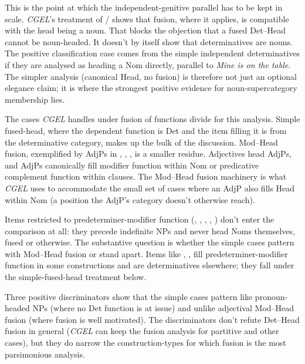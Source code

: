 \documentclass[12pt]{article}
\begin{document}
This is the point at which the independent-genitive parallel has to be kept in scale. \textit{CGEL}'s treatment of / shows that fusion, where it applies, is compatible with the head being a noun. That blocks the objection that a fused Det--Head cannot be noun-headed. It doesn't by itself show that determinatives are nouns. The positive classification case comes from the simple independent determinatives if they are analysed as heading a Nom directly, parallel to \textit{Mine is on the table}. The simpler analysis (canonical Head, no fusion) is therefore not just an optional elegance claim; it is where the strongest positive evidence for noun-supercategory membership lies.

The cases \textit{CGEL} handles under fusion of functions divide for this analysis. Simple fused-head, where the dependent function is Det and the item filling it is from the determinative category, makes up the bulk of the discussion. Mod--Head fusion, exemplified by AdjPs in , , , is a smaller residue. Adjectives head AdjPs, and AdjPs canonically fill modifier function within Nom or predicative complement function within clauses. The Mod--Head fusion machinery is what \textit{CGEL} uses to accommodate the small set of cases where an AdjP also fills Head within Nom (a position the AdjP's category doesn't otherwise reach).

Items restricted to predeterminer-modifier function (, , , , ) don't enter the comparison at all: they precede indefinite NPs and never head Noms themselves, fused or otherwise. The substantive question is whether the simple cases pattern with Mod--Head fusion or stand apart. Items like , ,  fill predeterminer-modifier function in some constructions and are determinatives elsewhere; they fall under the simple-fused-head treatment below.

Three positive discriminators show that the simple cases pattern like pronoun-headed NPs (where no Det function is at issue) and unlike adjectival Mod--Head fusion (where fusion is well motivated). The discriminators don't refute Det--Head fusion in general (\textit{CGEL} can keep the fusion analysis for partitive and other cases), but they do narrow the construction-types for which fusion is the most parsimonious analysis.
\end{document}
